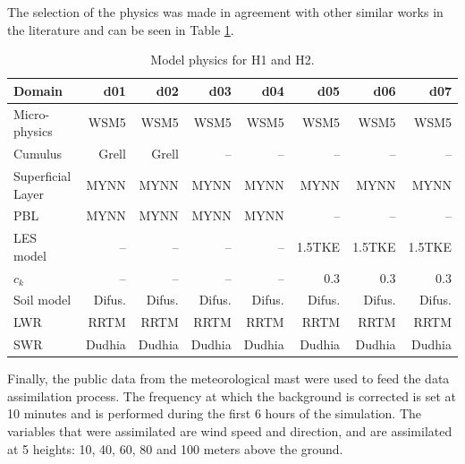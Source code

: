 The selection of the physics was made in agreement with other similar works in the literature and can be seen in Table \ref{tab:05_param_hov}.
\begin{table}
	\caption{Model physics for H1 and H2.}\label{tab:05_param_hov}
	\centering
	\begin{tabular}{lrrrrrrr}
		\toprule
		Domain 				& d01	&	d02	&	d03	&	d04	&	d05	&	d06 &	d07 \\
		\midrule
		Micro-physics		 	& WSM5 & WSM5 & WSM5 &WSM5&WSM5&WSM5&WSM5  \\
		Cumulus			 		& Grell & Grell & -- & -- & -- & -- & -- \\ 
		Superficial Layer	& MYNN & MYNN & MYNN & MYNN & MYNN & MYNN & MYNN \\
		PBL				 		& MYNN & MYNN & MYNN & MYNN & -- & -- & -- \\
		LES model				 		& -- & -- & -- & -- & 1.5TKE & 1.5TKE & 1.5TKE \\
		$c_k$				 		& -- & -- & -- & -- & 0.3 & 0.3 & 0.3 \\
		Soil model 		& Difus. & Difus. & Difus. & Difus. & Difus. & Difus. & Difus. \\
		LWR & RRTM &RRTM&RRTM&RRTM&RRTM&RRTM&RRTM \\
		SWR	& Dudhia &Dudhia&Dudhia&Dudhia&Dudhia&Dudhia&Dudhia \\
		\bottomrule
	\end{tabular}
\end{table}

Finally, the public data from the meteorological mast were used to feed the data assimilation process. The frequency at which the background is corrected is set at 10 minutes and is performed during the first 6 hours of the simulation. The variables that were assimilated are wind speed and direction, and are assimilated at 5 heights: 10, 40, 60, 80 and 100 meters above the ground.





